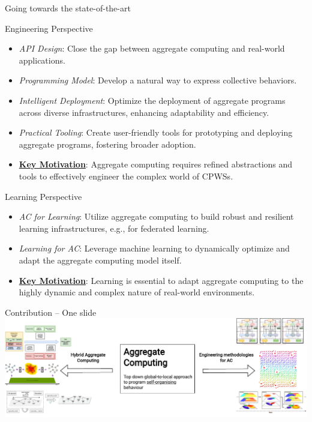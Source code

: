 \documentclass[presentation, 9pt,169]{beamer}\mode<presentation>{\usetheme{AMSBolognaFC}}
\begin{document}
\begin{frame}{Going towards the state-of-the-art}
  \begin{alertblock}{Engineering Perspective}
    \begin{itemize}
    \item \emph{API Design}: Close the gap between aggregate computing and real-world applications.%
    \item \emph{Programming Model}: Develop a natural way to express collective behaviors.%
    \item \emph{Intelligent Deployment}: Optimize the deployment of aggregate programs across diverse infrastructures, enhancing adaptability and efficiency.
    \item \emph{Practical Tooling}: Create user-friendly tools for prototyping and deploying aggregate programs, fostering broader adoption.
    \item \textbf{\underline{Key Motivation}}: Aggregate computing requires refined abstractions and tools to effectively engineer the complex world of CPWSs.
    \end{itemize}
    \end{alertblock}
  \begin{alertblock}{Learning Perspective}
      \begin{itemize}
      \item \emph{AC for Learning}: Utilize aggregate computing to build robust and resilient learning infrastructures, e.g., for federated learning.
      \item \emph{Learning for AC}: Leverage machine learning to dynamically optimize and adapt the aggregate computing model itself.
      \item \textbf{\underline{Key Motivation}}: Learning is essential to adapt aggregate computing to the highly dynamic and complex nature of real-world environments.
      \end{itemize}
  \end{alertblock}
\end{frame}
\begin{frame}{Contribution -- One slide}
\\[0.5cm]
\includegraphics[width=\textwidth]{img/contribution.drawio.pdf}
\end{frame}
\end{document}
